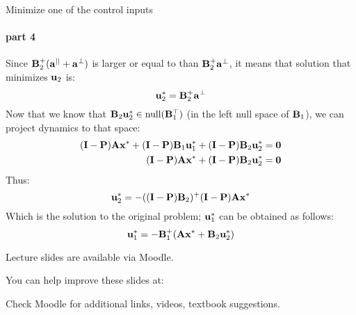 \documentclass{beamer}
\begin{document}
\begin{frame}{Minimize one of the control inputs}
\framesubtitle{part 4}
\begin{flushleft}

Since $\mathbf{B}_2^+ (\mathbf{a}^{||} + \mathbf{a}^\perp)$ is larger or equal to than $\mathbf{B}_2^+ \mathbf{a}^\perp$, it means that solution that minimizes $\mathbf{u}_2$ is:
%
\begin{equation}
    \mathbf{u}_2^* = \mathbf{B}_2^+ \mathbf{a}^\perp
\end{equation}
%
Now that we know that $\mathbf{B}_2 \mathbf{u}_2^* \in \text{null}(\mathbf{B}_1^\top)$ (in the left null space of $\mathbf{B}_1$), we can project dynamics to that space:
%
\begin{align*}
    (\mathbf{I} - \mathbf{P})\mathbf{A} \mathbf{x}^* + (\mathbf{I} - \mathbf{P})\mathbf{B}_1 \mathbf{u}_1^* + (\mathbf{I} - \mathbf{P})\mathbf{B}_2 \mathbf{u}_2^* = \mathbf{0} \\
    (\mathbf{I} - \mathbf{P})\mathbf{A} \mathbf{x}^* + (\mathbf{I} - \mathbf{P})\mathbf{B}_2 \mathbf{u}_2^* = \mathbf{0}
\end{align*}
%
Thus:
\begin{equation}
    \mathbf{u}_2^* = -((\mathbf{I} - \mathbf{P})\mathbf{B}_2)^+ (\mathbf{I} - \mathbf{P})\mathbf{A} \mathbf{x}^*
\end{equation}
%
Which is the solution to the original problem; $\mathbf{u}^*_1$ can be obtained as follows:
%
\begin{equation}
\label{Solution_u1}
      \mathbf{u}^*_1  = -\mathbf{B}^+_1(\mathbf{A} \mathbf{x}^* + \mathbf{B}_2 \mathbf{u}^*_2)
\end{equation}

\end{flushleft}
\end{frame}




\begin{frame}
	\centerline{Lecture slides are available via Moodle.}
	\bigskip
	\centerline{You can help improve these slides at:}
	\centerline{
		\mygit
	}
	\bigskip
	
	\textcolor{black}{}
	\bigskip
	
	
	\centerline{Check Moodle for additional links, videos, textbook suggestions.}
\end{frame}
\end{document}
